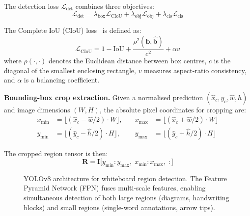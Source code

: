 \documentclass[11pt, a4paper]{article}
\newcommand{\Loss}{\mathcal{L}}
\begin{document}
The detection loss $\Loss_{\text{det}}$ combines three objectives:
\begin{equation}\label{eq:det_loss}
  \Loss_{\text{det}} = \lambda_{\text{box}} \Loss_{\text{CIoU}} + \lambda_{\text{obj}} \Loss_{\text{obj}} + \lambda_{\text{cls}} \Loss_{\text{cls}}
\end{equation}

The Complete IoU (CIoU) loss~\cite{zheng2020ciou} is defined as:
\begin{equation}\label{eq:ciou}
  \Loss_{\text{CIoU}} = 1 - \text{IoU} + \frac{\rho^2(\mathbf{b}, \hat{\mathbf{b}})}{c^2} + \alpha v
\end{equation}
where $\rho(\cdot, \cdot)$ denotes the Euclidean distance between box centres, $c$ is the diagonal of the smallest enclosing rectangle, $v$ measures aspect-ratio consistency, and $\alpha$ is a balancing coefficient.

\textbf{Bounding-box crop extraction.}  Given a normalised prediction $(\hat{x}_c, \hat{y}_c, \hat{w}, \hat{h})$ and image dimensions $(W, H)$, the absolute pixel coordinates for cropping are:
\begin{equation}\label{eq:crop}
\begin{aligned}
  x_{\min} &= \bigl\lfloor (\hat{x}_c - \hat{w}/2) \cdot W \bigr\rfloor, &\quad
  x_{\max} &= \bigl\lfloor (\hat{x}_c + \hat{w}/2) \cdot W \bigr\rfloor \\
  y_{\min} &= \bigl\lfloor (\hat{y}_c - \hat{h}/2) \cdot H \bigr\rfloor, &\quad
  y_{\max} &= \bigl\lfloor (\hat{y}_c + \hat{h}/2) \cdot H \bigr\rfloor
\end{aligned}
\end{equation}

The cropped region tensor is then:
\begin{equation}
  \mathbf{R} = \mathbf{I}\bigl[y_{\min}:y_{\max},\; x_{\min}:x_{\max},\; :\bigr]
\end{equation}

\begin{figure}[H]
  \centering
  \caption{YOLOv8 architecture for whiteboard region detection. The Feature Pyramid Network (FPN) fuses multi-scale features, enabling simultaneous detection of both large regions (diagrams, handwriting blocks) and small regions (single-word annotations, arrow tips).}
  \label{fig:yolo_arch}
\end{figure}
\end{document}

